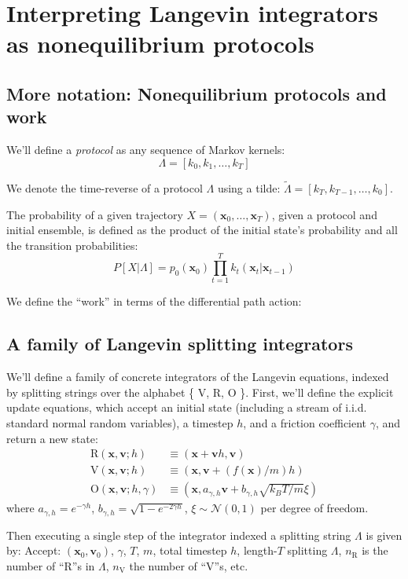 \documentclass[11pt]{article}
\newcommand{\x}{\mathbf{x}}
\newcommand{\vel}{\mathbf{v}}
\begin{document}
\section{Interpreting Langevin integrators as nonequilibrium protocols}
\subsection{More notation: Nonequilibrium protocols and work}
We'll define a \emph{protocol} as any sequence of Markov kernels: $$\Lambda=[k_0, k_1, \dots, k_T]$$

We denote the time-reverse of a protocol $\Lambda$ using a tilde: $\tilde{\Lambda} = [k_T, k_{T-1}, \dots, k_0]$.

The probability of a given trajectory $X = (\x_0, \dots, \x_T)$, given a protocol and initial ensemble, is defined as the product of the initial state's probability and all the transition probabilities:
$$P[X | \Lambda] = p_0 (\x_0) \prod_{t=1}^T k_t(\x_t | \x_{t-1})$$

We define the ``work'' in terms of the differential path action:



\subsection{A family of Langevin splitting integrators}
We'll define a family of concrete integrators of the Langevin equations, indexed by splitting strings over the alphabet \{ V, R, O \}.
First, we'll define the explicit update equations, which accept an initial state (including a stream of i.i.d. standard normal random variables), a timestep $h$, and a friction coefficient $\gamma$, and return a new state:
$$\begin{aligned}
\text{R}(\x, \vel ; h) &\equiv (\x + \vel h, \vel) \\
\text{V}(\x, \vel ; h) &\equiv (\x, \vel + (f(\x) / m) h) \\
\text{O}(\x, \vel ; h, \gamma) &\equiv (\x, a_{\gamma, h} \vel + b_{\gamma, h} \sqrt{k_B T / m} \xi)\end{aligned}$$
where $a_{\gamma, h} = e^{-\gamma h}$,
$b_{\gamma, h} = \sqrt{1 - e^{-2 \gamma h}}$,
$\xi \sim \mathcal{N}(0, 1)$ per degree of freedom.

Then executing a single step of the integrator indexed a splitting string $\Lambda$ is given by:
Accept: $(\x_0, \vel_0)$, $\gamma$, $T$, $m$, total timestep $h$, length-$T$ splitting $\Lambda$,
$n_\text{R}$ is the number of ``R''s in $\Lambda$, $n_\text{V}$ the number of ``V''s, etc.
\end{document}
